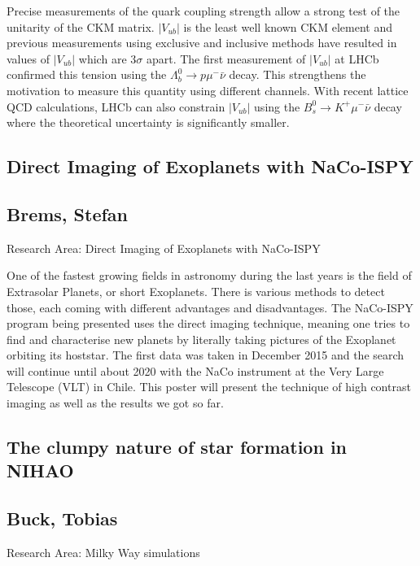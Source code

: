 \noindent Precise measurements of the quark coupling strength allow a strong test of the unitarity of the CKM matrix. $|V_{ub}|$ is the least well known CKM element and previous measurements using exclusive and inclusive methods have resulted in values of $|V_{ub}|$ which are 3$\sigma$ apart. The first measurement of $|V_{ub}|$ at LHCb confirmed this tension using the $\Lambda^0_b \rightarrow p \mu^- \bar{\nu}$ decay. This strengthens the motivation to measure this quantity using different channels. With recent lattice QCD calculations, LHCb can also constrain $|V_{ub}|$ using the $B^0_s\rightarrow K^+ \mu^- \bar{\nu}$ decay where the theoretical uncertainty is significantly smaller.

\newpage
\subsection*{\centering \large Direct Imaging of Exoplanets with NaCo-ISPY}
\subsection*{\centering \normalsize Brems, Stefan}
Research Area: Direct Imaging of Exoplanets with NaCo-ISPY\newline

\noindent One of the fastest growing fields in astronomy during the last years is the field of Extrasolar Planets, or short Exoplanets. There is various methods to detect those, each coming with different advantages and disadvantages. The NaCo-ISPY program being presented uses the direct imaging technique, meaning one tries to find and characterise new planets by literally taking pictures of the Exoplanet orbiting its hoststar. The first data was taken in December 2015 and the search will continue until about 2020 with the NaCo instrument at the Very Large Telescope (VLT) in Chile. This poster will present the technique of high contrast imaging as well as the results we got so far.


\subsection*{\centering \large The clumpy nature of star formation in NIHAO}
\subsection*{\centering \normalsize Buck, Tobias}
Research Area: Milky Way simulations\newline

